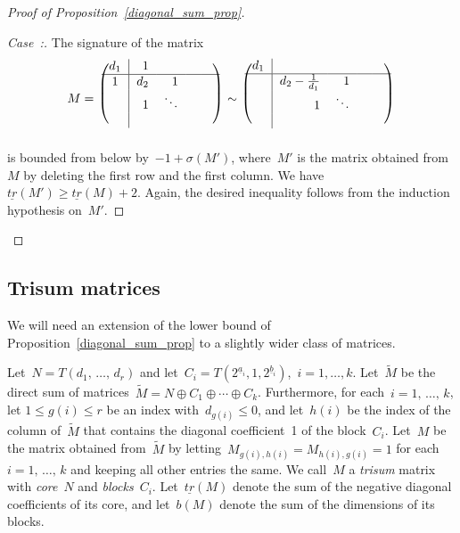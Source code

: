 \documentclass[10pt,a4paper]{amsart}
\numberwithin{equation}{section}
\newcounter{casecount}
\newenvironment{case}[1]{\refstepcounter{casecount}\begin{proof}[Case~\thecasecount:\;{#1}]}{\let\qed\relax\end{proof}}
\begin{document}
\begin{proof}[Proof of Proposition~\ref{diagonal_sum_prop}]
\begin{case}{{$d_1 \le -2$}}
The signature of the matrix
\begin{gather*}
M =\
\begin{blockarray}{crrrrc}
\begin{block}{(c|rrrrc)}
d_1 & 1 & \ & \ & \ \\ \BAhhline{-------------~} 1 & d_2 & 1 & \ & \ \\
\ & 1 & \ddots & & \\
\ & \ & & & \\
\end{block}
\end{blockarray}\
\sim\
\begin{blockarray}{crrrrc}
\begin{block}{(c|rrrrc)}
d_1 & & \ & \ & \ \\ \BAhhline{-------------~} & d_2-\frac{1}{d_1} & 1 & \ & \ \\
\ & 1 & \ddots & & \\
\ & \ & & & \\
\end{block}
\end{blockarray}\
\end{gather*}
is bounded from below by~$-1+\sigma(M')$, where~$M'$ is the matrix obtained from~$M$ by deleting the first row and the first column. We have~$\underline{tr}(M') \ge \underline{tr}(M)+2.$ Again, the desired inequality follows from the induction hypothesis on~$M'$.
\end{case}
\end{proof}

\subsection{Trisum matrices}

We will need an extension of the lower bound of Proposition~\ref{diagonal_sum_prop} to a slightly wider class of matrices.

Let~$N = T(d_1,\,\dots,\,d_r)$ and let~$C_i = T(2^{\underline a_i},1,2^{\underline b_i})$,~$i=1,\dots,k$. Let~$\widetilde M$ be the direct sum of matrices~$\widetilde M=N\oplus C_1 \oplus \cdots \oplus C_k$. Furthermore, for each~$i=1,\,\dots,\,k$, let $1 \le g(i) \le r$ be an index with~$d_{g(i)} \le 0$, and let~$h(i)$ be the index of the column of~$\widetilde M$ that contains the diagonal coefficient~1 of the block~$C_i$. Let~$M$ be the matrix obtained from~$\widetilde M$ by letting~$M_{g(i),h(i)} = M_{h(i),g(i)} = 1$ for each~$i=1,\,\dots,\,k$ and keeping all other entries the same. We call~$M$ a \emph{trisum} matrix with \emph{core}~$N$ and \emph{blocks}~$C_i$. Let~$\underline{tr}(M)$ denote the sum of the negative diagonal coefficients of its core, and let~$b(M)$ denote the sum of the dimensions of its blocks.
\end{document}
